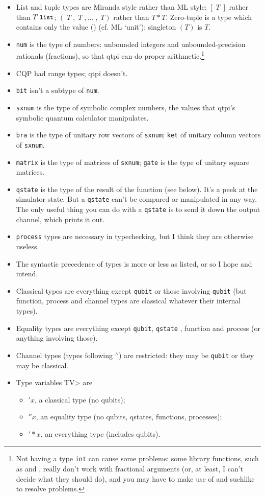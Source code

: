 \documentclass[11pt,a4paper]{article}
\newcommand{\verbtt}[1]{\texttt{\small{}#1}}
\begin{document}
\begin{itemize}
\item List and tuple types are Miranda style rather than ML style: $[\;T\;]$ rather than $T\;\verbtt{list}$; $(\;T\;,\;T\;,...\;,\;T)$ rather than $T*T$. Zero-tuple is a type which contains only the value () (cf. ML `unit'); singleton $(T)$ is $T$.
\item \verbtt{num} is the type of numbers: unbounded integers and unbounded-precision rationals (fractions), so that qtpi can do proper arithmetic.\footnote{Not having a type \verbtt{int} can cause some problems: some library functions, such as  and , really don't work with fractional arguments (or, at least, I can't decide what they should do), and you may have to make use of  and suchlike to resolve problems.}
\item CQP had range types; qtpi doesn't.
\item \verbtt{bit} isn't a subtype of \verbtt{num}.
\item \verbtt{sxnum} is the type of symbolic complex numbers, the values that qtpi's symbolic quantum calculator manipulates.
\item \verbtt{bra} is the type of unitary row vectors of \verbtt{sxnum}; \verbtt{ket} of unitary column vectors of \verbtt{sxnum}. 
\item \verbtt{matrix}  is the type of matrices of \verbtt{sxnum}; \verbtt{gate} is the type of unitary square matrices.
\item \verbtt{qstate}  is the type of the result of the   function (see below). It's a peek at the simulator state. But a \verbtt{qstate} can't be compared or manipulated in any way. The only useful thing you can do with a \verbtt{qstate}  is to send it down the  output channel, which prints it out.
\item \verbtt{process} types are necessary in typechecking, but I think they are otherwise useless.
\item The syntactic precedence of types is more or less as listed, or so I hope and intend. 
\item Classical types are everything except \verbtt{qubit}  or those involving \verbtt{qubit}  (but function, process and channel types are classical whatever their internal types).  
\item Equality types are everything except \verbtt{qubit}, \verbtt{qstate} , function and process (or anything involving those).  
\item Channel types (types following $^{\wedge}$) are restricted: they may be \verbtt{qubit} or they may be classical.
\item Type variables \<TV> are \begin{itemize}
		\item $'x$, a classical type (no qubits);		
		\item $''x$, an equality type (no qubits, qstates, functions, processes);
		\item $'{*}x$, an everything type (includes qubits).
	\end{itemize}
\end{itemize}
\end{document}
